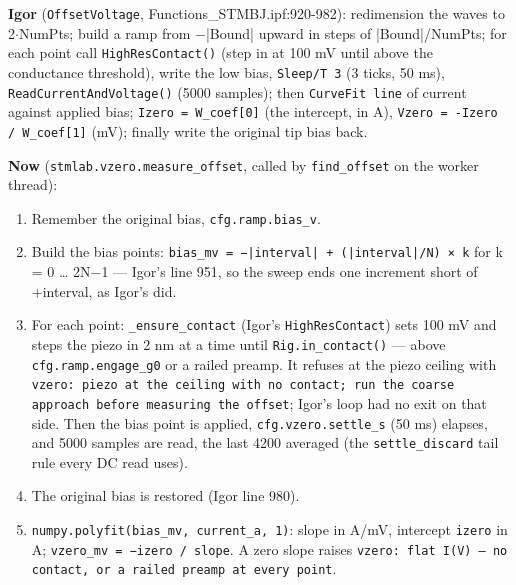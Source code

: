 \textbf{Igor} (\texttt{Offset\discretionary{}{}{}Voltage}, Functions\_STMBJ.ipf:920-982): redimension the waves to 2$\cdot$NumPts; build a ramp from −|Bound| upward in steps of
|Bound|/NumPts; for each point call \texttt{High\discretionary{}{}{}Res\discretionary{}{}{}Contact()} (step in at 100 mV until above the conductance threshold), write the low bias, \texttt{Sleep/\discretionary{}{}{}T 3} (3 ticks, 50 ms), \texttt{Read\discretionary{}{}{}Current\discretionary{}{}{}And\discretionary{}{}{}Voltage()} (5000 samples); then \texttt{Curve\discretionary{}{}{}Fit line} of current against applied bias; \texttt{Izero = W\_\discretionary{}{}{}coef[0]} (the intercept, in \textmu{}A), \texttt{Vzero = -Izero /\discretionary{}{}{} W\_\discretionary{}{}{}coef[1]} (mV); finally write the original tip bias back.

\textbf{Now} (\texttt{stmlab.\discretionary{}{}{}vzero.\discretionary{}{}{}measure\_\discretionary{}{}{}offset}, called by \texttt{find\_\discretionary{}{}{}offset} on the worker thread):

\begin{enumerate}[leftmargin=*]
\item Remember the original bias, \texttt{cfg.\discretionary{}{}{}ramp.\discretionary{}{}{}bias\_\discretionary{}{}{}v}.
\item Build the bias points: \texttt{bias\_\discretionary{}{}{}mv = −|interval| + (|interval|/\discretionary{}{}{}N) × k} for k = 0 \ldots{} 2N−1 --- Igor's line 951, so the sweep ends one increment short of +interval, as Igor's did.
\item For each point: \texttt{\_\discretionary{}{}{}ensure\_\discretionary{}{}{}contact} (Igor's \texttt{High\discretionary{}{}{}Res\discretionary{}{}{}Contact}) sets 100 mV and steps the piezo in 2 nm at a time until \texttt{Rig.\discretionary{}{}{}in\_\discretionary{}{}{}contact()} --- above \texttt{cfg.\discretionary{}{}{}ramp.\discretionary{}{}{}engage\_\discretionary{}{}{}g0} or a railed preamp. It refuses at the piezo ceiling with \texttt{vzero: piezo at the ceiling with no contact; run the coarse approach before measuring the offset}; Igor's loop had no exit on that side. Then the bias point is applied, \texttt{cfg.\discretionary{}{}{}vzero.\discretionary{}{}{}settle\_\discretionary{}{}{}s} (50 ms) elapses, and 5000 samples are read, the last 4200 averaged (the \texttt{settle\_\discretionary{}{}{}discard} tail rule every DC read uses).
\item The original bias is restored (Igor line 980).
\item \texttt{numpy.\discretionary{}{}{}polyfit(bias\_\discretionary{}{}{}mv,\discretionary{}{}{} current\_\discretionary{}{}{}a,\discretionary{}{}{} 1)}: slope in A/mV, intercept \texttt{izero} in A; \texttt{vzero\_\discretionary{}{}{}mv = −izero /\discretionary{}{}{} slope}. A zero slope raises \texttt{vzero: flat I(V) -- no contact,\discretionary{}{}{} or a railed preamp at every point}.
\end{enumerate}

